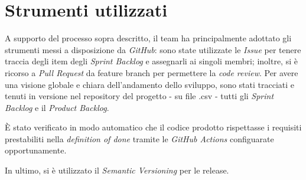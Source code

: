 \section{Strumenti utilizzati}\label{sec:strumenti-utilizzati}
A supporto del processo sopra descritto, il team ha principalmente adottato gli strumenti messi a disposizione da \textit{GitHub}: sono state utilizzate le \textit{Issue} per
tenere traccia degli item degli \textit{Sprint Backlog} e assegnarli ai singoli membri;
inoltre, si è ricorso a \textit{Pull Request} da feature branch per permettere la \textit{code review}.
Per avere una visione globale e chiara dell'andamento dello sviluppo, sono stati tracciati e tenuti in versione nel repository del progetto - su file .csv - tutti gli \textit{Sprint Backlog} e il \textit{Product Backlog}.

È stato verificato in modo automatico che il codice prodotto rispettasse i requisiti prestabiliti nella \textit{definition of done} tramite le \textit{GitHub Actions} configuarate opportunamente.

In ultimo, si è utilizzato il \textit{Semantic Versioning} per le release.
